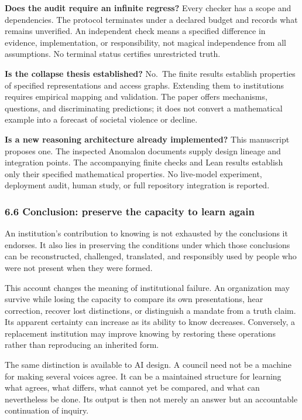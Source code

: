 \documentclass[
  10pt,
]{article}
\begin{document}
\textbf{Does the audit require an infinite regress?} Every checker has a scope and dependencies. The protocol terminates under a declared budget and records what remains unverified. An independent check means a specified difference in evidence, implementation, or responsibility, not magical independence from all assumptions. No terminal status certifies unrestricted truth.

\textbf{Is the collapse thesis established?} No.~The finite results establish properties of specified representations and access graphs. Extending them to institutions requires empirical mapping and validation. The paper offers mechanisms, questions, and discriminating predictions; it does not convert a mathematical example into a forecast of societal violence or decline.

\textbf{Is a new reasoning architecture already implemented?} This manuscript proposes one. The inspected Anomalon documents supply design lineage and integration points. The accompanying finite checks and Lean results establish only their specified mathematical properties. No live-model experiment, deployment audit, human study, or full repository integration is reported.

\subsubsection{6.6 Conclusion: preserve the capacity to learn again}\label{conclusion-preserve-the-capacity-to-learn-again}

An institution's contribution to knowing is not exhausted by the conclusions it endorses. It also lies in preserving the conditions under which those conclusions can be reconstructed, challenged, translated, and responsibly used by people who were not present when they were formed.

This account changes the meaning of institutional failure. An organization may survive while losing the capacity to compare its own presentations, hear correction, recover lost distinctions, or distinguish a mandate from a truth claim. Its apparent certainty can increase as its ability to know decreases. Conversely, a replacement institution may improve knowing by restoring these operations rather than reproducing an inherited form.

The same distinction is available to AI design. A council need not be a machine for making several voices agree. It can be a maintained structure for learning what agrees, what differs, what cannot yet be compared, and what can nevertheless be done. Its output is then not merely an answer but an accountable continuation of inquiry.
\end{document}
